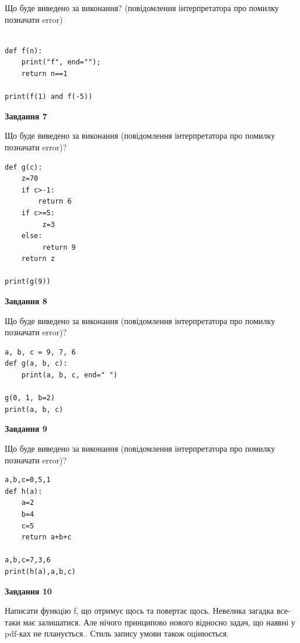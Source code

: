 \documentclass[12pt, ukrainian]{article}
\begin{document}
{\begin {large}
Що буде виведено за виконання? (повідомлення інтерпретатора про помилку позначати error)\par
\begin{verbatim}

def f(n):
    print("f", end="");
    return n==1

print(f(1) and f(-5))
\end{verbatim}

{\begin {center}\textbf{Завдання 7}\end {center}}

Що буде виведено за виконання (повідомлення інтерпретатора про помилку позначати error)?\par
\begin{verbatim}
def g(c):
    z=70
    if c>-1: 
        return 6
    if c>=5:
         z=3
    else:
         return 9
    return z

print(g(9))
\end{verbatim}

{\begin {center}\textbf{Завдання 8}\end {center}}

Що буде виведено за виконання (повідомлення інтерпретатора про помилку позначати error)?\par
\begin{verbatim}
a, b, c = 9, 7, 6
def g(a, b, c):
    print(a, b, c, end=" ")

g(0, 1, b=2)
print(a, b, c)
\end{verbatim}

{\begin {center}\textbf{Завдання 9}\end {center}}

Що буде виведено за виконання (повідомлення інтерпретатора про помилку позначати error)?\par
\begin{verbatim}
a,b,c=0,5,1
def h(a):
    a=2
    b=4
    c=5
    return a+b+c

a,b,c=7,3,6
print(h(a),a,b,c)
\end{verbatim}

{\begin {center}\textbf{Завдання 10}\end {center}}


Написати функцiю f, що отримує щось та повертає щось. Невелика загадка все-таки має залишатися. Але нічого принципово нового відносно задач, що наявні у pdf-ках не планується.. Стиль запису умови також оцінюється.\par
\end {large}}
\newpage
\end{document}
